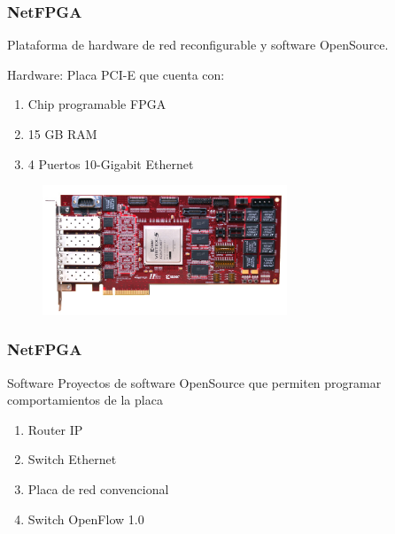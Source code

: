 \documentclass{beamer}
\begin{document}
\begin{frame}
\frametitle{NetFPGA} 


	Plataforma de hardware de red reconfigurable y software OpenSource.



		Hardware: Placa PCI-E que cuenta con: 
		\begin{enumerate}
			\item Chip programable FPGA 
			\item 15 GB RAM
			\item 4 Puertos 10-Gigabit Ethernet
		\end{enumerate}
		
	\begin{figure}[H]
		\includegraphics[width=0.65\textwidth, right]{imagenes/NetFPGA10G_web.jpg}
	\end{figure}


\end{frame}




\begin{frame}
\frametitle{NetFPGA} 
\begin{block}{Software}
Proyectos de software OpenSource que permiten programar comportamientos de la placa

\begin{enumerate}
\item Router IP
\item Switch Ethernet
\item Placa de red convencional
\item Switch OpenFlow 1.0
\end{enumerate}

\end{block}

\end{frame}
\end{document}
